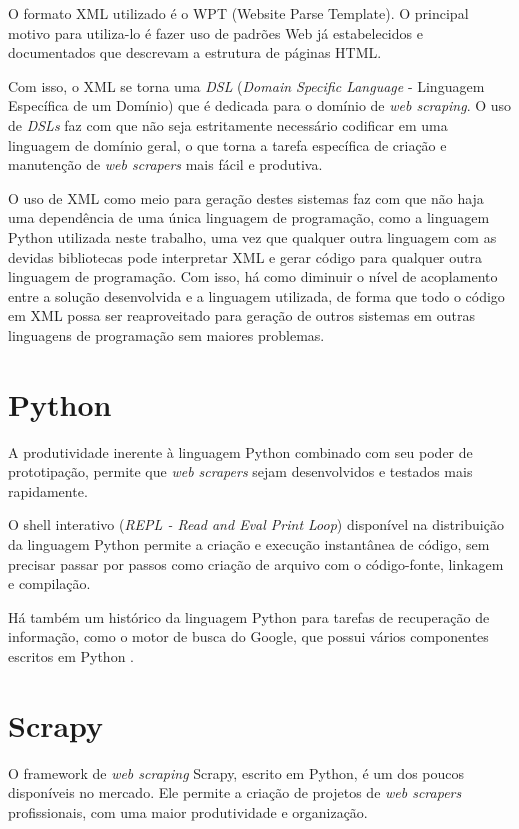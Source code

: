 O formato XML utilizado é o WPT (Website Parse Template)\cite{wpt}. O principal motivo para utiliza-lo é fazer uso de padrões Web já estabelecidos e documentados que descrevam a estrutura de páginas HTML.

Com isso, o XML se torna uma \emph{DSL} (\emph{Domain Specific Language} - Linguagem Específica de um Domínio) que é dedicada para o domínio de \emph{web scraping}. O uso de \emph{DSLs} faz com que não seja estritamente necessário codificar em uma linguagem de domínio geral, o que torna a tarefa específica de criação e manutenção de \emph{web scrapers} mais fácil e produtiva.

O uso de XML como meio para geração destes sistemas faz com que não haja uma dependência de uma única linguagem de programação, como a linguagem Python utilizada neste trabalho, uma vez que qualquer outra linguagem com as devidas bibliotecas pode interpretar XML e gerar código para qualquer outra linguagem de programação. Com isso, há como diminuir o nível de acoplamento entre a solução desenvolvida e a linguagem utilizada, de forma que todo o código em XML possa ser reaproveitado para geração de outros sistemas em outras linguagens de programação sem maiores problemas.

\section{Python}

A produtividade inerente à linguagem Python combinado com seu poder de prototipação, permite que \emph{web scrapers} sejam desenvolvidos e testados mais rapidamente.

O shell interativo (\emph{REPL - Read and Eval Print Loop}) disponível na distribuição da linguagem Python permite a criação e execução instantânea de código, sem precisar passar por passos como criação de arquivo com o código-fonte, linkagem e compilação.

Há também um histórico da linguagem Python para tarefas de recuperação de informação, como o motor de busca do Google, que possui vários componentes escritos em Python \cite{google}.

\section{Scrapy}

O framework de \emph{web scraping} Scrapy, escrito em Python, é um dos poucos disponíveis no mercado. Ele permite a criação de projetos de \emph{web scrapers} profissionais, com uma maior produtividade e organização.

